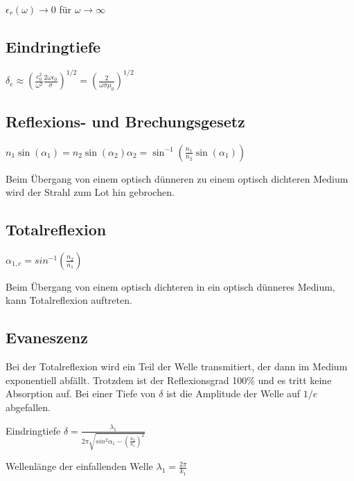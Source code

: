 \documentclass[10pt,a4paper]{scrartcl}
\begin{document}
\begin{multicols*}{3}
	$\epsilon_r(\omega)\rightarrow 0$ für $\omega\rightarrow\infty$	
	
	\subsection{Eindringtiefe}
	
	$\delta_e\approx(\frac{c_0^2}{\omega^2}\frac{2\omega \epsilon_0}{\sigma})^{1/2}=(\frac{2}{\omega\sigma\mu_0})^{1/2}$	 
	
	\subsection{Reflexions- und Brechungsgesetz}
	$n_1\sin(\alpha_1)=n_2\sin(\alpha_2)$\hfill$\alpha_2=\sin^{-1}\left(\frac{n_1}{n_2}\sin(\alpha_1)\right)$
	
	Beim Übergang von einem optisch dünneren zu einem optisch dichteren Medium wird der Strahl zum Lot hin gebrochen.
	
	
	
	\subsection{Totalreflexion}
	
	$\alpha_{1,c}=sin^{-1}(\frac{n_2}{n_1})$
	
	Beim Übergang von einem optisch dichteren in ein optisch dünneres Medium, kann Totalreflexion auftreten.
	
	\subsection{Evaneszenz}
	
	Bei der Totalreflexion wird ein Teil der Welle transmitiert, der dann im Medium exponentiell abfällt. Trotzdem ist der Reflexionsgrad 100\% und es tritt keine Absorption auf. Bei einer Tiefe von $\delta$ ist die Amplitude der Welle auf $1/e$ abgefallen.
	
	Eindringtiefe $\delta = \frac{\lambda_1}{2\pi\sqrt{sin^2\alpha_1-(\frac{n_2}{n_1})^2}}$
	
	Wellenlänge der einfallenden Welle $\lambda_1 = \frac{2\pi}{k_1}$
	

\end{multicols*}
\end{document}
